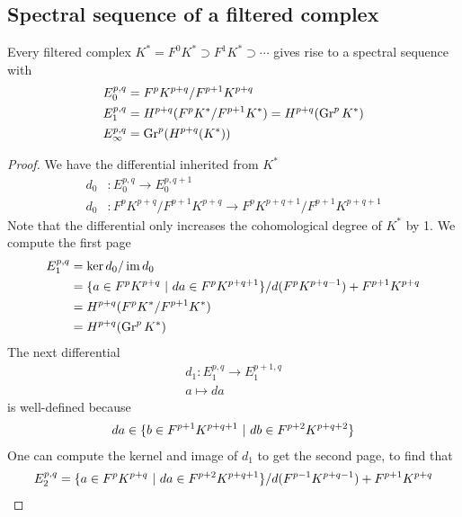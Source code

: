 \documentclass[12pt]{article}
\begin{document}
\subsection{Spectral sequence of a filtered complex}
\begin{proposition}
    Every filtered complex $K^* = F^0K^* \supset F^1K^* \supset \cdots$ gives rise
    to a spectral sequence with \begin{align*}
        E_0^{p,q}      & = F^pK^{p+q}/F^{p+1}K^{p+q}                       \\
        E_1^{p,q}      & = H^{p+q}(F^pK^*/F^{p+1}K^*) = H^{p+q}(\operatorname{Gr}^p K^*) \\
        E_\infty^{p,q} & = \operatorname{Gr}^p(H^{p+q}(K^*))
    \end{align*}
\end{proposition}
\begin{proof}
    We have the differential inherited from $K^*$ \begin{align*}
        d_0 & : E_0^{p,q} \to E_0^{p,q+1}                                   \\
        d_0 & : F^pK^{p+q}/F^{p+1}K^{p+q} \to F^pK^{p+q+1}/F^{p+1}K^{p+q+1}
    \end{align*} Note that the differential only increases the cohomological degree of $K^*$ by 1. We compute the first page \begin{align*}
        E_1^{p,q} & = \ker d_0 / \operatorname{im} d_0                                                               \\
                  & = \{a\in F^pK^{p+q} \ \vert \  da \in F^pK^{p+q+1}\} / d(F^pK^{p+q-1}) + F^{p+1}K^{p+q} \\
                  & = H^{p+q}(F^pK^*/F^{p+1}K^*)                                                       \\
                  & = H^{p+q}(\operatorname{Gr}^p K^*)
    \end{align*} The next differential \begin{align*}
        d_1: E_1^{p,q} \to E_1^{p+1,q} \\
        a \mapsto da
    \end{align*} is well-defined because \begin{align*}
        da \in \{b\in F^{p+1}K^{p+q+1} \ \vert \  db \in F^{p+2}K^{p+q+2}\}
    \end{align*} One can compute the kernel and image of $d_1$ to get the second page,
    to find that \begin{align*}
        E_2^{p,q} = \set{a \in F^pK^{p+q} \st da \in F^{p+2}K^{p+q+1}} / d(F^{p-1}K^{p+q-1}) + F^{p+1}K^{p+q}

\end{align*}
\end{proof}
\end{document}
